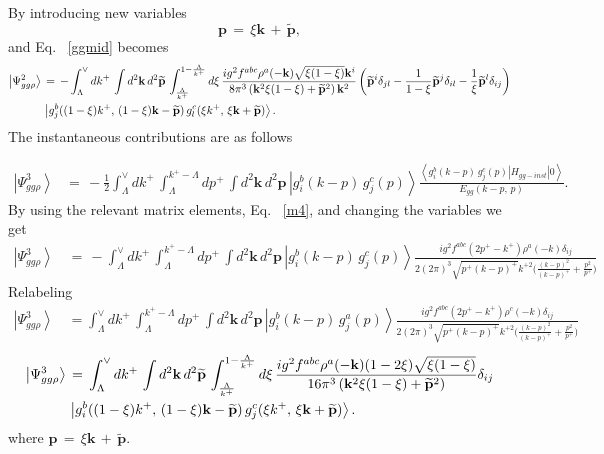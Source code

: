\documentclass[aps,prd,amsmath,amssymb,nofootinbib]{revtex4-2}
\numberwithin{equation}{section}
\begin{document}
By introducing new variables 
$$\mathbf{p}\,=\,\xi \mathbf{k}\,+\,\widetilde{\mathbf{p}},$$
and Eq.~ \eqref{ggmid} becomes
\begin{align}\label{contgg}
\left|\Psi_{gg\rho}^{2}\right\rangle\, & =\,-\int_{\Lambda}^{\vee}dk^{+}\,\int d^{2}\mathbf{k}\, d^{2}\widetilde{\mathbf{p}}\,\int_{\frac{\Lambda}{k^{+}}}^{1-\frac{\Lambda}{k^{+}}}d\xi\,\frac{ig^{2}f^{abc}\rho^{a}(-\mathbf{k})\sqrt{\xi(1-\xi)}\mathbf{k}^{i}}{8\pi^{3}\left(\mathbf{k}^{2}\xi(1-\xi)+\widetilde{\mathbf{p}}^{2}\right)\mathbf{k}^{2}}\left(\widetilde{\mathbf{p}}^{i}\delta_{jl}-\frac{1}{1-\xi}\widetilde{\mathbf{p}}^{j}\delta_{il}-\frac{1}{\xi}\widetilde{\mathbf{p}}^{l}\delta_{ij}\right)\notag \\ & \left|g_{j}^{b}((1-\xi)k^{+},\,(1-\xi)\mathbf{k}-\widetilde{\mathbf{p}})\,g_{l}^{c}(\xi k^{+},\,\xi\mathbf{k}+\widetilde{\mathbf{p}})\right\rangle.
\end{align}
The instantaneous contributions are as follows
\begin{figure}[h]
\end{figure}
\begin{align}\label{ggthree}
\left|\Psi_{gg\rho}^{3}\right\rangle &= \,-\frac{1}{2}\int_{\Lambda}^{\vee}dk^{+}\,\int_{\Lambda}^{k^{+}-\Lambda}dp^{+}\,\int d^{2}\mathbf{k}\, d^{2}\mathbf{p}\,\left|g_{i}^{b}(k-p)\, g_{j}^{c}(p)\right\rangle \frac{\left\langle g_{i}^{b}(k-p)\, g_{j}^{c}(p)\left|H_{gg-inst}\right|0\right\rangle }{E_{gg}(k-p,\, p)}.
\end{align}
By using the relevant matrix elements, Eq.~ \eqref{m4}, and changing the variables we get
\begin{align}\label{instgg3}
\left|\Psi_{gg\rho}^{3}\right\rangle \,& =\, -\int_{\Lambda}^{\vee}dk^{+}\,\int_{\Lambda}^{k^{+}-\Lambda}dp^{+}\,\int d^{2}\mathbf{k}\, d^{2}\mathbf{p}\,\left|g_{i}^{b}(k-p)\, g_{j}^{c}(p)\right\rangle  \frac{ig^{2}f^{abc}(2p^{+}-k^{+})\rho^{a}(-k)\delta_{ij}}{2(2\pi)^{3}\sqrt{p^{+}(k-p)^{+}}k^{+ 2}\bigg(\frac{(k-p)^{2}}{(k-p)^{+}}+\frac{p^{2}}{p^{+}}\bigg)}
\end{align}
Relabeling 
\begin{align}
\left|\Psi_{gg\rho}^{3}\right\rangle \,& =\int_{\Lambda}^{\vee}dk^{+}\,\int_{\Lambda}^{k^{+}-\Lambda}dp^{+}\,\int d^{2}\mathbf{k}\, d^{2}\mathbf{p}\,\left|g_{i}^{b}(k-p)\, g_{j}^{a}(p)\right\rangle  \frac{ig^{2}f^{abc}(2p^{+}-k^{+})\rho^{c}(-k)\delta_{ij}}{2(2\pi)^{3}\sqrt{p^{+}(k-p)^{+}}k^{+ 2}\bigg(\frac{(k-p)^{2}}{(k-p)^{+}}+\frac{p^{2}}{p^{+}}\bigg)}
\end{align}
\begin{align}\label{contgg3}
\left|\Psi_{gg\rho}^{3}\right\rangle \,& =\,\int_{\Lambda}^{\vee}dk^{+}\,\int d^{2}\mathbf{k}\,d^{2}\widetilde{\mathbf{p}}\,\int_{\frac{\Lambda}{k^{+}}}^{1-\frac{\Lambda}{k^{+}}}d\xi\,\frac{ig^{2}f^{abc}\rho^{a}(-\mathbf{k})(1-2\xi)\sqrt{\xi(1-\xi)}}{16\pi^{3}\left(\mathbf{k}^{2}\xi(1-\xi)+\widetilde{\mathbf{p}}^{2}\right)}\delta_{ij}\notag \\ & \left|g_{i}^{b}((1-\xi)k^{+},\,(1-\xi)\mathbf{k}-\widetilde{\mathbf{p}})\,g_{j}^{c}(\xi k^{+},\,\xi\mathbf{k}+\widetilde{\mathbf{p}})\right\rangle .\end{align}
where $\mathbf{p}\,=\,\xi \mathbf{k}\,+\,\widetilde{\mathbf{p}}$. 
\end{document}
